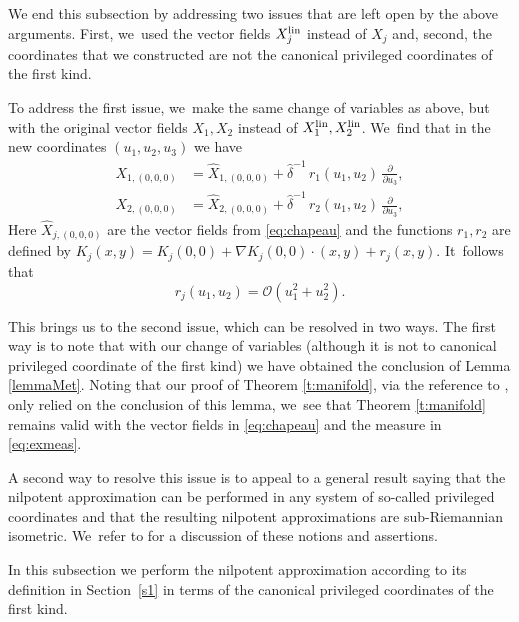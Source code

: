 \documentclass[JEP,XML,SOM,Unicode,published]{cedram}
\newcommand{\lin}{\textup{lin}}
\theoremstyle{definition}
\newcommand{\1}{\mathbbm{1}}
\begin{document}
We end this subsection by addressing two issues that are left open by the above arguments. First, we~used the vector fields $X_j^\lin$ instead of $X_j$ and, second, the coordinates that we constructed are not the canonical privileged coordinates of the first kind.

To address the first issue, we~make the same change of variables as above, but with the original vector fields $X_1,X_2$ instead of $X_1^\lin,X_2^\lin$. We~find that in the new coordinates $(u_1,u_2,u_3)$ we have
\begin{align*}
X_{1,(0,0,0)} & = \widehat X_{1,(0,0,0)} + \widehat\delta^{-1} \,r_1(u_1,u_2) \,\frac{\partial}{\partial u_3},\\
X_{2,(0,0,0)} & = \widehat X_{2,(0,0,0)} + \widehat\delta^{-1} \,r_2(u_1,u_2) \,\frac{\partial}{\partial u_3},
\end{align*}
Here $\widehat X_{j,(0,0,0)}$ are the vector fields from \eqref{eq:chapeau} and the functions $r_1,r_2$ are defined by $K_j(x,y)= K_j(0,0) + \nabla K_j(0,0) \cdot (x, y) + r_{j} (x,y)$. It~follows that
\[
r_{j}(u_1,u_2) = \mathcal O (u_1^2 + u_2^2).
\]

This brings us to the second issue, which can be resolved in two ways. The first way is to note that with our change of variables (although it is not to canonical privileged coordinate of the first kind) we have obtained the conclusion of Lemma \ref{lemmaMet}. Noting that our proof of Theorem \ref{t:manifold}, via the reference to \cite{Rot}, only relied on the conclusion of this lemma, we~see that Theorem \ref{t:manifold} remains valid with the vector fields in \eqref{eq:chapeau} and the measure in \eqref{eq:exmeas}.

A second way to resolve this issue is to appeal to a general result saying that the nilpotent approximation can be performed in any system of so-called privileged coordinates and that the resulting nilpotent approximations are sub-Riemannian isometric. We~refer to \cite[\S A.5.4]{CHT1} for a discussion of these notions and assertions.

In this subsection we perform the nilpotent approximation according to its definition in Section~\ref{s1} in terms of the canonical privileged coordinates of the first kind.
\end{document}

